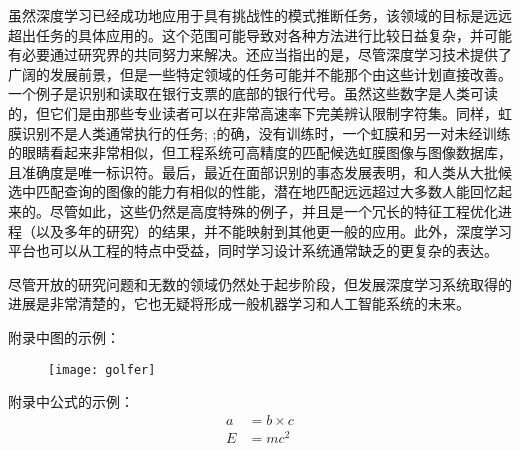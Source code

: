 虽然深度学习已经成功地应用于具有挑战性的模式推断任务，该领域的目标是远远超出任务的具体应用的。这个范围可能导致对各种方法进行比较日益复杂，并可能有必要通过研究界的共同努力来解决。还应当指出的是，尽管深度学习技术提供了广阔的发展前景，但是一些特定领域的任务可能并不能那个由这些计划直接改善。一个例子是识别和读取在银行支票的底部的银行代号。虽然这些数字是人类可读的，但它们是由那些专业读者可以在非常高速率下完美辨认限制字符集。同样，虹膜识别不是人类通常执行的任务; ;的确，没有训练时，一个虹膜和另一对未经训练的眼睛看起来非常相似，但工程系统可高精度的匹配候选虹膜图像与图像数据库，且准确度是唯一标识符。最后，最近在面部识别的事态发展表明，和人类从大批候选中匹配查询的图像的能力有相似的性能，潜在地匹配远远超过大多数人能回忆起来的。尽管如此，这些仍然是高度特殊的例子，并且是一个冗长的特征工程优化进程（以及多年的研究）的结果，并不能映射到其他更一般的应用。此外，深度学习平台也可以从工程的特点中受益，同时学习设计系统通常缺乏的更复杂的表达。

尽管开放的研究问题和无数的领域仍然处于起步阶段，但发展深度学习系统取得的进展是非常清楚的，它也无疑将形成一般机器学习和人工智能系统的未来。



附录中图的示例：
\begin{figure}[htbp]
\centering
\texttt{[image: golfer]}
\vspace{-1em}
\end{figure}

附录中公式的示例：
\begin{align}
a & = b \times c \\
E & = m c^2
\end{align}

